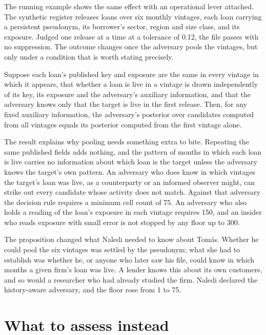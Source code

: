 The running example shows the same effect with an operational lever attached. The
synthetic register releases loans over six monthly vintages, each loan carrying a
persistent pseudonym, its borrower's sector, region and size class, and its
exposure. Judged one release at a time at a tolerance of 0.12, the file passes with
no suppression. The outcome changes once the adversary pools the vintages, but only
under a condition that is worth stating precisely.

\begin{proposition}\label{prop:nohistory}
Suppose each loan's published key and exposure are the same in every vintage in
which it appears, that whether a loan is live in a vintage is drawn independently
of its key, its exposure and the adversary's auxiliary information, and that the
adversary knows only that the target is live in the first release. Then, for any
fixed auxiliary information, the adversary's posterior over candidates computed
from all vintages equals its posterior computed from the first vintage alone.
\end{proposition}

The result explains why pooling needs something extra to bite. Repeating the same
published fields adds nothing, and the pattern of months in which each loan is live
carries no information about which loan is the target unless the adversary knows
the target's own pattern. An adversary who does know in which vintages the target's
loan was live, as a counterparty or an informed observer might, can strike out every
candidate whose activity does not match. Against that adversary the decision rule
requires a minimum cell count of 75. An adversary who also holds a reading of the
loan's exposure in each vintage requires 150, and an insider who reads exposure with
small error is not stopped by any floor up to 300.

The proposition changed what Naledi needed to know about Tomás. Whether he could pool the six
vintages was settled by the pseudonym; what she had to establish was whether he, or anyone who
later saw his file, could know in which months a given firm's loan was live. A lender knows this
about its own customers, and so would a researcher who had already studied the firm. Naledi
declared the history-aware adversary, and the floor rose from 1 to 75.

\section{What to assess instead}\label{sec:prog-remedies}


